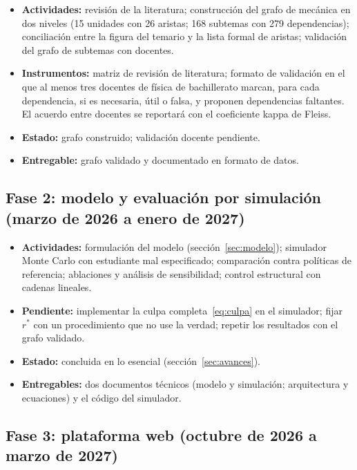 \documentclass[12pt]{article}
\theoremstyle{definition}
\newcommand{\rstar}{r^{\ast}}
\begin{document}
\begin{itemize}
\item \textbf{Actividades:} revisión de la literatura; construcción del grafo de mecánica en dos niveles (15 unidades con 26 aristas; 168 subtemas con 279 dependencias); conciliación entre la figura del temario y la lista formal de aristas; validación del grafo de subtemas con docentes.
\item \textbf{Instrumentos:} matriz de revisión de literatura; formato de validación en el que al menos tres docentes de física de bachillerato marcan, para cada dependencia, si es necesaria, útil o falsa, y proponen dependencias faltantes. El acuerdo entre docentes se reportará con el coeficiente kappa de Fleiss.
\item \textbf{Estado:} grafo construido; validación docente pendiente.
\item \textbf{Entregable:} grafo validado y documentado en formato de datos.
\end{itemize}

\subsection{Fase 2: modelo y evaluación por simulación (marzo de 2026 a enero de 2027)}

\begin{itemize}
\item \textbf{Actividades:} formulación del modelo (sección~\ref{sec:modelo}); simulador Monte Carlo con estudiante mal especificado; comparación contra políticas de referencia; ablaciones y análisis de sensibilidad; control estructural con cadenas lineales.
\item \textbf{Pendiente:} implementar la culpa completa~\eqref{eq:culpa} en el simulador; fijar $\rstar$ con un procedimiento que no use la verdad; repetir los resultados con el grafo validado.
\item \textbf{Estado:} concluida en lo esencial (sección~\ref{sec:avances}).
\item \textbf{Entregables:} dos documentos técnicos (modelo y simulación; arquitectura y ecuaciones) y el código del simulador.
\end{itemize}

\subsection{Fase 3: plataforma web (octubre de 2026 a marzo de 2027)}
\end{document}

